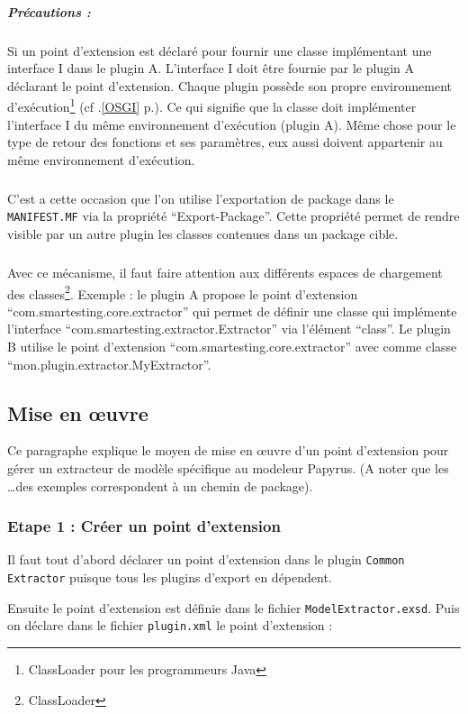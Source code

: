 \subparagraph{Précautions :}
Si un point d'extension est déclaré pour fournir une classe implémentant une interface I dans le plugin A. 
L'interface I doit être fournie par le plugin A déclarant le point d'extension.
Chaque plugin possède son propre environnement d'exécution\footnote{ClassLoader pour les programmeurs Java} (cf .\ref{OSGI} p.\pageref{OSGI}).
Ce qui signifie que la classe doit implémenter l'interface I du même environnement d'exécution (plugin A).
Même chose pour le type de retour des fonctions et ses paramètres, eux aussi doivent appartenir au même environnement d'exécution.

\subparagraph*{}
C'est a cette occasion que l'on utilise l'exportation de package dans le \texttt{MANIFEST.MF} via la propriété ``Export-Package''. Cette propriété permet de rendre visible par un autre plugin les classes contenues dans un package cible.

\subparagraph*{}
Avec ce mécanisme, il faut faire attention aux différents espaces de chargement des classes\footnote{ClassLoader}. Exemple : le plugin A propose le point d'extension \newline ``com.smartesting.core.extractor'' qui permet de définir une classe qui implémente l'interface  ``com.smartesting.extractor.Extractor'' via l'élément ``class''. Le plugin B utilise le point d'extension  ``com.smartesting.core.extractor'' avec comme classe \newline ``mon.plugin.extractor.MyExtractor''.

\subsection{Mise en \oe uvre}\label{subsection:MiseEnOeuvre}

Ce paragraphe explique le moyen de mise en \oe uvre d'un point d'extension pour gérer un extracteur de modèle spécifique au modeleur Papyrus. (A noter que les \ldots des exemples correspondent à un chemin de package).

\subsubsection{Etape 1 : Créer un point d'extension}

Il faut tout d'abord déclarer un point d'extension dans le plugin \texttt{Common Extractor} puisque tous les plugins d'export en dépendent.

Ensuite le point d'extension est définie dans le fichier \texttt{ModelExtractor.exsd}.
Puis on déclare dans le fichier \texttt{plugin.xml} le point d'extension :

